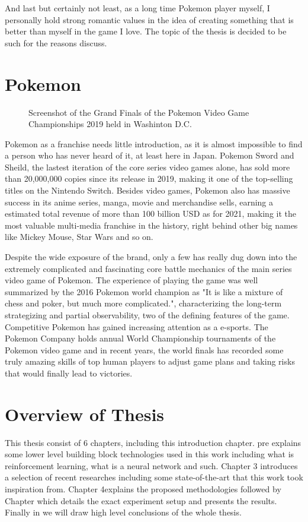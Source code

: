 And last but certainly not least, as a long time Pokemon player myself, I
personally hold strong romantic values in the idea of creating something that
is better than myself in the game I love. The topic of the thesis is decided to
be such for the reasons discuss.

\section{Pokemon}
\begin{figure}
  \centering
  
    \caption{Screenshot of the Grand Finals of the Pokemon Video Game Championships 2019 held in Washinton D.C.}
\end{figure}
Pokemon as a franchise needs little introduction, as it is almost impossible to
find a person who has never heard of it, at least here in Japan. Pokemon Sword
and Sheild, the lastest iteration of the core series video games alone, has
sold more than 20,000,000 copies since its release in 2019, making it one of
the top-selling titles on the Nintendo Switch. Besides video games, Pokemon
also has massive success in its anime series, manga, movie and merchandise
sells, earning a estimated total revenue of more than 100 billion USD as for
2021, making it the most valuable multi-media franchise in the history, right
behind other big names like Mickey Mouse, Star Wars and so on.

Despite the wide exposure of the brand, only a few has really dug down into the
extremely complicated and fascinating core battle mechanics of the main series
video game of Pokemon. The experience of playing the game was well summarized
by the 2016 Pokemon world champion as "It is like a mixture of chess and poker,
but much more complicated.", characterizing the long-term strategizing and
partial observability, two of the defining features of the game. Competitive
Pokemon has gained increasing attention as a e-sports. The Pokemon Company
holds annual World Championship tournaments of the Pokemon video game and in
recent years, the world finals has recorded some truly amazing skills of top
human players to adjust game plans and taking risks that would finally lead to
victories.

\section{Overview of Thesis}
This thesis consist of 6 chapters, including this introduction chapter.
 pre explains some lower level building block
technologies used in this work including what is reinforcement learning, what
is a neural network and such. Chapter 3  introduces a selection
of recent researches including some state-of-the-art that this work took
inspiration from. Chapter 4explains the proposed methodologies
followed by Chapter which details the exact experiment setup
and presents the results. Finally in we will draw high
level conclusions of the whole thesis.

